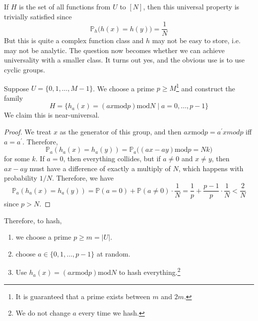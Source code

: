 \documentclass{article}
\begin{document}
    If $H$ is the set of all functions from $U$ to $[N]$, then this universal property is trivially satisfied since 
    \begin{equation}
        \mathbb{P}_{h} \big( h(x) = h(y) \big) = \frac{1}{N}
    \end{equation}
    But this is quite a complex function class and $h$ may not be easy to store, i.e. may not be analytic. The question now becomes whether we can achieve universality with a smaller class. It turns out yes, and the obvious use is to use cyclic groups. 

    \begin{lemma}
      Suppose $U = \{0, 1, \ldots, M-1\}$. We choose a prime $p \geq M$\footnote{It is guaranteed that a prime exists between $m$ and $2m$.} and construct the family 
      \begin{equation}
        H = \{h_a (x) = (ax \mathrm{ mod } p ) \mathrm{ mod } N \mid a = 0, \ldots, p-1 \}
      \end{equation}
      We claim this is near-universal. 
    \end{lemma}
    \begin{proof}
      We treat $x$ as the generator of this group, and then $ax \mathrm{ mod } p = a^\prime x { mod } p$ iff $a = a^\prime$. Therefore, 
      \begin{equation}
        \mathbb{P}_a (h_a (x) = h_a (y)) = \mathbb{P}_a \big( (ax - ay) \mathrm{ mod } p = N k \big)
      \end{equation}
      for some $k$. If $a = 0$, then everything collides, but if $a \neq 0$ and $x \neq y$, then $ax - ay$ must have a difference of exactly a multiply of $N$, which happens with probability $1/N$. Therefore, we have 
      \begin{equation}
        \mathbb{P}_a (h_a (x) = h_a (y)) = \mathbb{P}(a = 0) + \mathbb{P}(a \neq 0) \cdot \frac{1}{N} = \frac{1}{p} + \frac{p-1}{p} \cdot \frac{1}{N} < \frac{2}{N} 
      \end{equation}
      since $p > N$. 
    \end{proof}

    Therefore, to hash, 
    \begin{enumerate}
      \item we choose a prime $p \geq m = |U|$. 
      \item choose $a \in \{0, 1, \ldots, p-1\}$ at random. 
      \item Use $h_a(x) = (ax \mathrm{ mod } p ) \mathrm{ mod } N$ to hash everything.\footnote{We do not change $a$ every time we hash. }
    \end{enumerate}
\end{document}
